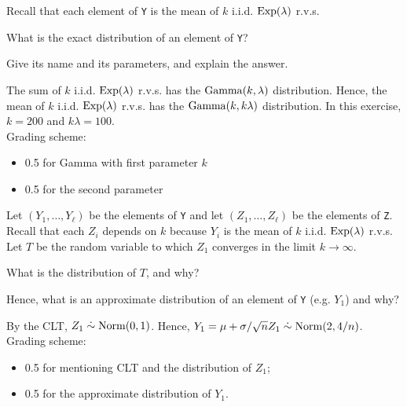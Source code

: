 \vspace*{20pt}


Recall that each element of  \texttt{Y} is the mean of $k$ i.i.d. $\mathrm{Exp}(\lambda)$ r.v.s.

\begin{exercise}[1]
What is the exact distribution of an element of \texttt{Y}? 

Give its name and its parameters, and explain the answer.
\begin{solution}
The sum of $k$ i.i.d.  $\mathrm{Exp}(\lambda)$ r.v.s. has the $\mathrm{Gamma}(k, \lambda)$ distribution.
Hence, the mean of $k$ i.i.d.  $\mathrm{Exp}(\lambda)$ r.v.s. has the $\mathrm{Gamma}(k, k\lambda)$ distribution.
In this exercise, $k=200$ and $k\lambda = 100$. \\ 
Grading scheme:
\begin{itemize}
\item 0.5 for Gamma with first parameter $k$
\item 0.5 for the second parameter
\end{itemize}
\end{solution}
\end{exercise}


\vspace*{30pt}



Let $(Y_1, \ldots, Y_{\ell})$ be the elements of \texttt{Y} and let $(Z_1, \ldots, Z_{\ell})$ be the elements of  \texttt{Z}. Recall that each $Z_i$ depends on $k$ because $Y_i$ is the mean of $k$ i.i.d. $\mathrm{Exp}(\lambda)$ r.v.s. Let $T$ be the random variable to which $Z_1$ converges in the limit  $k \to \infty$.

\begin{exercise}[1]
What is the distribution of $T$, and why? 

Hence, what is an approximate distribution of an element of \texttt{Y} (e.g. $Y_1$) and why?
\begin{solution}
By the CLT, $Z_1 \;\dot{\sim}\; \mathrm{Norm}(0,1)$. Hence,  $Y_1 = \mu + \sigma/\sqrt{n}Z_1 \;\dot{\sim}\; \mathrm{Norm}(2,4/n)$. \\ 
Grading scheme:
\begin{itemize}
\item 0.5 for mentioning CLT and the distribution of $Z_1$;
\item 0.5 for the approximate distribution of $Y_1$.
\end{itemize}
\end{solution}
\end{exercise}


